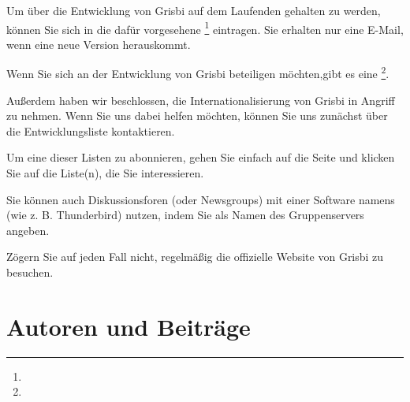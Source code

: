 Um über die Entwicklung von Grisbi auf dem Laufenden gehalten zu werden, können Sie sich in die dafür vorgesehene \footnote{\urlListInfoEmail{}} eintragen. Sie erhalten nur eine E-Mail, wenn eine neue Version herauskommt.

Wenn Sie sich an der Entwicklung von Grisbi beteiligen möchten,gibt es eine \footnote{\urlListDevelEmail{}}.

Außerdem haben wir beschlossen, die Internationalisierung von Grisbi in Angriff zu nehmen. Wenn Sie uns dabei helfen möchten, können Sie uns zunächst über die Entwicklungsliste kontaktieren.

Um eine dieser Listen zu abonnieren, gehen Sie einfach auf die Seite \urlListDiffGrisbi{} und klicken Sie auf die Liste(n), die Sie interessieren.


Sie können auch Diskussionsforen (oder Newsgroups) mit einer Software namens  (wie z. B. Thunderbird) nutzen, indem Sie  als Namen des Gruppenservers angeben.

Zögern Sie auf jeden Fall nicht, regelmäßig die offizielle Website von Grisbi zu besuchen.



\section{Autoren und Beiträge\label{introduction-authors}}		%


